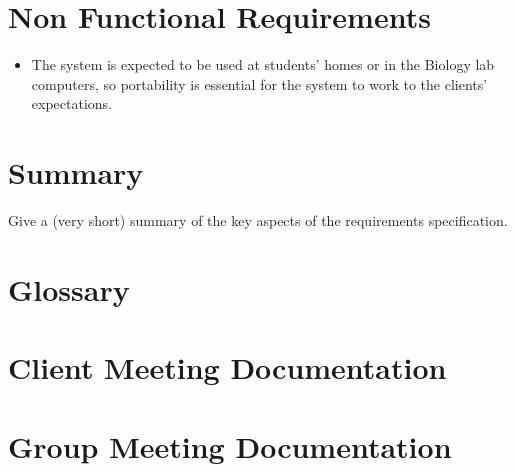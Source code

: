\documentclass{l3deliverable}
\begin{document}


\section{Non Functional Requirements}


\begin{itemize}
\item{
The system is expected to be used at students' homes or in the Biology
lab computers, so portability is essential for the system to work to
the clients' expectations.
}
\end{itemize}

\section{Summary}

Give a (very short) summary of the key aspects of the requirements
specification.


\appendix

\section{Glossary}



\section{Client Meeting Documentation}
\label{sec:clientMeetingDocs}


\section{Group Meeting Documentation}

\end{document}
